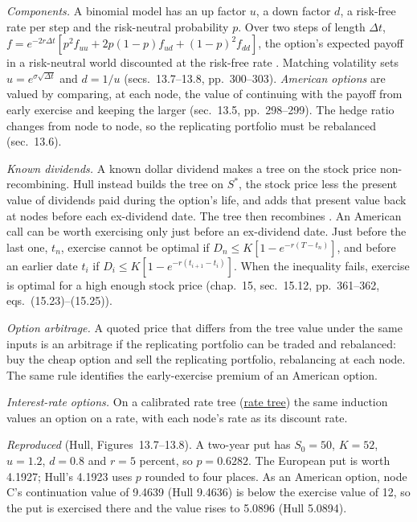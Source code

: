 \begin{qfmethod}\label{meth:multi-period-binomial-valuation}
 \emph{Components.} A binomial model has an up factor $u$, a down factor $d$, a risk-free rate per step and the risk-neutral probability $p$. Over two steps of length $\Delta t$, $f=e^{-2r\Delta t}[p^2f_{uu}+2p(1-p)f_{ud}+(1-p)^2f_{dd}]$, the option's expected payoff in a risk-neutral world discounted at the risk-free rate \citep[chap.~13, sec.~13.3, eqs.~(13.5)--(13.10), pp.~294--297]{s7-hulloptions}. Matching volatility sets $u=e^{\sigma\sqrt{\Delta t}}$ and $d=1/u$ (secs.~13.7--13.8, pp.~300--303). \emph{American options} are valued by comparing, at each node, the value of continuing with the payoff from early exercise and keeping the larger (sec.~13.5, pp.~298--299). The hedge ratio changes from node to node, so the replicating portfolio must be rebalanced (sec.~13.6).

\emph{Known dividends.} A known dollar dividend makes a tree on the stock price non-recombining. Hull instead builds the tree on $S^*$, the stock price less the present value of dividends paid during the option's life, and adds that present value back at nodes before each ex-dividend date. The tree then recombines \citep[chap.~21, sec.~21.3, pp.~480--483]{s7-hulloptions}. An American call can be worth exercising only just before an ex-dividend date. Just before the last one, $t_n$, exercise cannot be optimal if $D_n\le K[1-e^{-r(T-t_n)}]$, and before an earlier date $t_i$ if $D_i\le K[1-e^{-r(t_{i+1}-t_i)}]$. When the inequality fails, exercise is optimal for a high enough stock price (chap.~15, sec.~15.12, pp.~361--362, eqs.~(15.23)--(15.25)).

\emph{Option arbitrage.} A quoted price that differs from the tree value under the same inputs is an arbitrage if the replicating portfolio can be traded and rebalanced: buy the cheap option and sell the replicating portfolio, rebalancing at each node. The same rule identifies the early-exercise premium of an American option.

\emph{Interest-rate options.} On a calibrated rate tree (\hyperref[meth:binomial-rate-tree-calibration]{rate tree}) the same induction values an option on a rate, with each node's rate as its discount rate.

 \emph{Reproduced} (Hull, Figures~13.7--13.8). A two-year put has $S_0=50$, $K=52$, $u=1.2$, $d=0.8$ and $r=5$ percent, so $p=0.6282$. The European put is worth 4.1927; Hull's 4.1923 uses $p$ rounded to four places. As an American option, node C's continuation value of 9.4639 (Hull 9.4636) is below the exercise value of 12, so the put is exercised there and the value rises to 5.0896 (Hull 5.0894).


\end{qfmethod}
